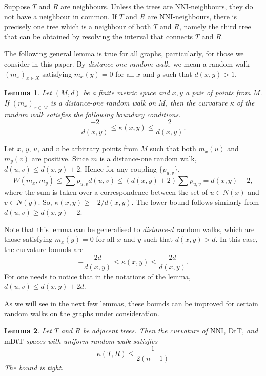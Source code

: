 \documentclass{amsart}
\newtheorem{lemma}{Lemma}
\newcommand{\dts}{\mathrm{DtT}}
\newcommand{\nni}{\mathrm{NNI}}
\newcommand{\mdts}{\mathrm{mDtT}}
\begin{document}
\proof
Suppose $T$ and $R$ are neighbours.
Unless the trees are NNI-neighbours, they do not have a neighbour in common.
If $T$ and $R$ are NNI-neighbours, there is precisely one tree which is a neighbour of both $T$ and $R$, namely the third tree that can be obtained by resolving the interval that connects $T$ and $R$.
\endproof

The following general lemma is true for all graphs, particularly, for those we consider in this paper.
By {\em distance-one random walk}, we mean a random walk $(m_x)_{x \in X}$ satisfying $m_x(y) = 0$ for all $x$ and $y$ such that $d(x,y) > 1$.

\begin{lemma}\label{curvBoundGeneral}
Let $(M,d)$ be a finite metric space and $x,y$ a pair of points from $M$. If
$(m_x)_{x \in M}$ is a distance-one random walk on $M$, then the curvature
$\kappa$ of the random walk satisfies the following boundary conditions.
\[
\dfrac{-2}{d(x,y)} \leq \kappa(x,y) \leq \dfrac{2}{d(x,y)}.
\]
\end{lemma}

\proof
Let $x$, $y$, $u$, and $v$ be arbitrary points from $M$ such that both $m_x(u)$
and $m_y(v)$ are positive. Since $m$ is a distance-one random walk,
$d(u,v) \leq d(x,y) + 2$. Hence for any coupling $\{p_{u,v}\}$,
\[
W(m_x,m_y) \leq \sum p_{u,v} d(u,v) \leq (d(x,y)+2)\sum p_{u,v} = d(x,y) + 2,
\]
where the sum is taken over a correspondence between the set of $u \in N(x)$ and
$v \in N(y)$. So, $\kappa(x,y) \geq - 2/d(x,y)$. The lower bound follows
similarly from $d(u,v) \geq d(x,y) - 2$.
\endproof

Note that this lemma can be generalised to {\em distance-$d$} random walks,
which are those satisfying $m_x(y) = 0$ for all $x$ and $y$ such that
$d(x,y) > d$. In this case, the curvature bounds are
\[
-\dfrac{2d}{d(x,y)} \leq \kappa(x,y) \leq \dfrac{2d}{d(x,y)}.
\]
For one needs to notice that in the notations of the lemma,
$d(u,v) \leq d(x,y) + 2d$.

As we will see in the next few lemmas, these bounds can be improved for certain random walks on the graphs under consideration.

\begin{lemma}\label{uniformUpper}
Let $T$ and $R$ be adjacent trees.
Then the curvature of $\nni$, $\dts$, and $\mdts$ spaces with uniform random walk satisfies
\[
\kappa(T,R) \leq \dfrac{1}{2(n-1)}
\]
The bound is tight.
\end{lemma}
\end{document}
